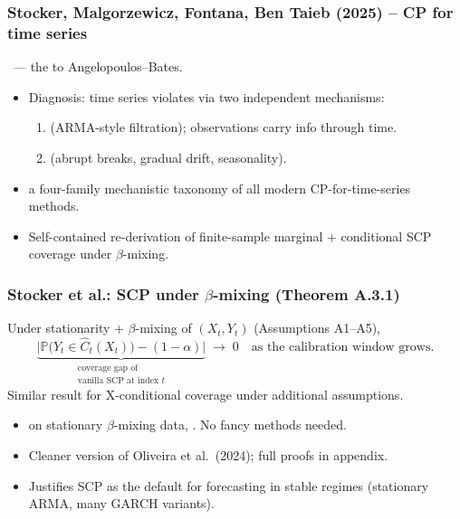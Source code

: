 \documentclass[11pt, aspectratio=169, xcolor={dvipsnames}, usepdftitle=false]{beamer}
\begin{document}
\begin{frame}
\frametitle{Stocker, Malgorzewicz, Fontana, Ben Taieb (2025) -- CP for time series}
~--- the  to Angelopoulos--Bates.
\begin{itemize}
\item Diagnosis: time series violates  via two independent mechanisms:
\begin{enumerate}
\item {} (ARMA-style filtration); observations carry info through time.
\item {} (abrupt breaks, gradual drift, seasonality).
\end{enumerate}
\item {} a four-family mechanistic taxonomy of all modern CP-for-time-series methods.
\item Self-contained re-derivation of finite-sample marginal + conditional SCP coverage under $\beta$-mixing.
\end{itemize}
\end{frame}

\begin{frame}
\frametitle{Stocker et al.: SCP under $\beta$-mixing (Theorem A.3.1)}
\begin{theorem}
Under stationarity + $\beta$-mixing of $(X_t, Y_t)$ (Assumptions A1--A5),
\begin{equation*}
\underbrace{\bigl|\mathbb{P}\bigl(Y_t \in \hat{C}_t(X_t)\bigr) - (1 - \alpha)\bigr|}_{\substack{\text{coverage gap of}\\\text{vanilla SCP at index } t}}
\;\to\;
0 \quad \text{as the calibration window grows}.
\end{equation*}
Similar result for X-conditional coverage under additional assumptions.
\end{theorem}
\begin{itemize}
\item {} on stationary $\beta$-mixing data, . No fancy methods needed.
\item Cleaner version of Oliveira et al.\ (2024); full proofs in appendix.
\item Justifies SCP as the default for forecasting in stable regimes (stationary ARMA, many GARCH variants).
\end{itemize}
\end{frame}
\end{document}
